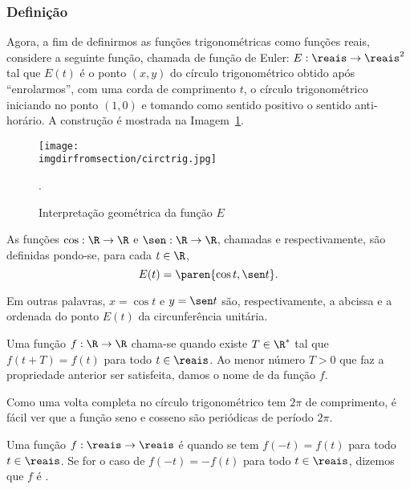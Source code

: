 \subsubsection{Definição}

Agora, a fim de definirmos as funções trigonométricas como funções
reais, considere a seguinte função, chamada de função de Euler: $E:
\reais \to \reais^2$ tal que $E(t)$ é o ponto $(x, y)$ do círculo
trigonométrico obtido após ``enrolarmos'', com uma corda de comprimento
$t$, o círculo trigonométrico iniciando no ponto $(1, 0)$ e tomando
como sentido positivo o sentido anti-horário. 
A construção é mostrada na Imagem~\ref{fig:ciclo-trigonometrico}.

\begin{figure}
\centering
\texttt{[image: \\imgdirfromsection/circtrig.jpg]}
\caption{Interpretação geométrica da função $E$}.
\label{fig:ciclo-trigonometrico}
\end{figure}

\begin{definition}
    As funções $\cos : \R \to \R$ e $\sen : \R \to \R$, chamadas
 e  respectivamente, são
definidas pondo-se, para cada $t \in \R$,
$$E(t) = \paren{\cos t , \sen t}.$$

Em outras palavras, $x= \cos t$ e $y = \sen t$ são, respectivamente,
a abcissa e a ordenada do ponto $E(t)$ da circunferência unitária.
\end{definition}

\begin{definition}
    Uma função $f: \R \to \R$ chama-se  quando existe $T
\in \R^\ast$ tal que $f(t + T) = f(t)$ para todo $t \in \reais$. Ao
menor número $T>0$ que faz a propriedade anterior ser satisfeita,
damos o nome de  da função $f$.
\end{definition}

\begin{remark}
    Como uma volta completa no círculo trigonométrico tem $2 \pi$ de
comprimento, é fácil ver que a função seno e cosseno são periódicas
de período $2\pi$.
\end{remark}

\begin{definition}
\label{def:funcao-par-impar}
    Uma função $f: \reais \to \reais$ é  quando se tem $f(-t) = f(t)$
para todo $t\in \reais$. Se for o caso de $f(-t) = - f(t)$ para todo $t
\in \reais$, dizemos que $f$ é .
\end{definition}

